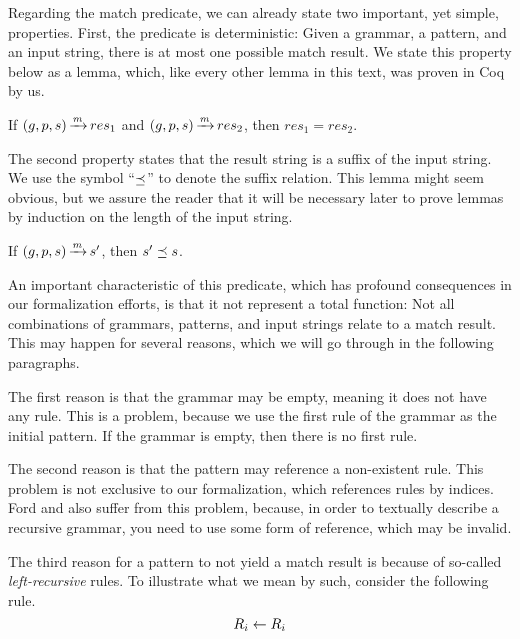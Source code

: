 Regarding the match predicate,
we can already state two important,
yet simple, properties.
First, the predicate is deterministic:
Given a grammar, a pattern, and an input string,
there is at most one possible match result.
We state this property below as a lemma,
which, like every other lemma in this text,
was proven in Coq by us.

\begin{lemma}%
    If ${(g,p,s) \operatorname{\xrightarrow{\mathit{m}}} res_1}$
    and ${(g,p,s) \operatorname{\xrightarrow{\mathit{m}}} res_2}$,
    then ${res_1 = res_2}$.
    \label{lemma:match-determinism}
\end{lemma}

The second property states that the result string
is a suffix of the input string.
We use the symbol ``${\preceq}$''
to denote the suffix relation.
This lemma might seem obvious,
but we assure the reader that it will be necessary later
to prove lemmas by induction on the length of the input string.

\begin{lemma}%
    If ${(g,p,s) \operatorname{\xrightarrow{\mathit{m}}} s'}$,
    then ${s' \preceq s}$.
    \label{lemma:match-suffix}
\end{lemma}

An important characteristic of this predicate,
which has profound consequences in our formalization efforts,
is that it not represent a total function:
Not all combinations of
grammars, patterns, and input strings
relate to a match result.
This may happen for several reasons,
which we will go through
in the following paragraphs.

The first reason is that
the grammar may be empty,
meaning it does not have any rule.
This is a problem,
because we use the first rule of the grammar
as the initial pattern.
If the grammar is empty,
then there is no first rule.

The second reason is that
the pattern may reference a non-existent rule.
This problem is not exclusive to our formalization,
which references rules by indices.
Ford and \lpeg{}
also suffer from this problem,
because,
in order to textually describe a recursive grammar,
you need to use some form of reference,
which may be invalid.

The third reason for
a pattern to not yield a match result
is because of so-called \emph{left-recursive} rules.
To illustrate what we mean by such,
consider the following rule.
\begin{equation}
    \Rule{\PNT{i}}{\PNT{i}}
    \label{eqn:lr-rule-simple}
\end{equation}


